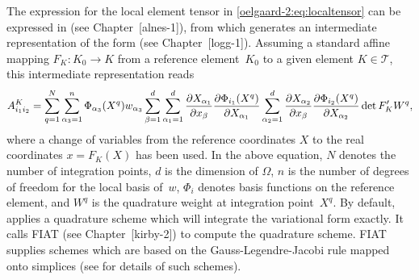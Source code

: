 The expression for the local element tensor in
\eqref{oelgaard-2:eq:localtensor} can be expressed in \ufl{}
(see Chapter~[alnes-1]), from which \ffc{} generates an intermediate
representation of the form (see Chapter~[logg-1]).
Assuming a standard affine mapping $F_K : K_0 \rightarrow K$ from a reference
element~$K_{0}$ to a given element $K \in \mathcal{T}$, this intermediate
representation reads
%
\begin{equation}
\small
  A^K_{i_{1} i_{2}}
  =
  \sum_{q=1}^{N}
%
  \sum_{\alpha_{3}=1}^n
  \Phi_{\alpha_{3}}(X^q)
  w_{\alpha_{3}}
%
  \sum_{\beta=1}^d
  \sum_{\alpha_1=1}^d
  \frac{\partial X_{\alpha_1}}{\partial x_{\beta}}
  \frac{\partial \Phi_{i_1}(X^q)}{\partial X_{\alpha_1}}
  \sum_{\alpha_2=1}^d
  \frac{\partial X_{\alpha_2}}{\partial x_{\beta}}
  \frac{\partial \Phi_{i_2}(X^q)}{\partial X_{\alpha_2}}
  \det F_K'
  W^q,
\label{oelgaard-2:eq:weightedlaplacian_quadraturerepresentation}
\end{equation}
%
where a change of variables from the reference coordinates $X$ to the real
coordinates $x = F_K(X)$ has been used. In the above equation, $N$ denotes the
number of integration points, $d$ is the dimension of $\Omega$, $n$
is the number of degrees of freedom for the local basis of~$w$, $\Phi_{i}$
denotes basis functions on the reference element, and $W^q$ is the quadrature
weight at integration point~$X^q$.
By default, \ffc{} applies a quadrature scheme which will integrate the
variational form exactly.
It calls FIAT (see Chapter~[kirby-2]) to compute the quadrature scheme.
FIAT supplies schemes which are based on the Gauss-Legendre-Jacobi rule
mapped onto simplices (see \citet{karniadakis:2005} for details of such schemes).

